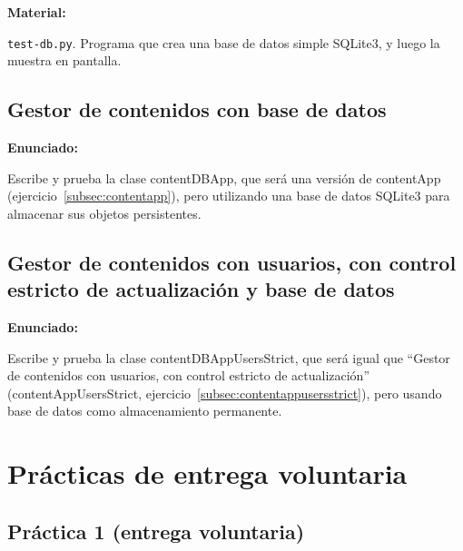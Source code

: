 \textbf{Material:}

\texttt{test-db.py}. Programa que crea una base de datos simple SQLite3, y luego la muestra en pantalla.

\subsection{Gestor de contenidos con base de datos}
\label{subsec:gestor-contenidos-bbdd}

\textbf{Enunciado:}

Escribe y prueba la clase contentDBApp, que será una versión de contentApp (ejercicio~\ref{subsec:contentapp}), pero utilizando una base de datos SQLite3 para almacenar sus objetos persistentes.

\subsection{Gestor de contenidos con usuarios, con control estricto de actualización y base de datos}
\label{subsec:gestor-contenidos-usuarios-bbdd}

\textbf{Enunciado:}

Escribe y prueba la clase contentDBAppUsersStrict, que será igual que ``Gestor de contenidos con usuarios, con control estricto de actualización'' (contentAppUsersStrict, ejercicio~\ref{subsec:contentappusersstrict}), pero usando base de datos como almacenamiento permanente.

\newpage

\section{Prácticas de entrega voluntaria}


\subsection{Práctica 1 (entrega voluntaria)}
\label{subsec:practica-vol-1-2016}

